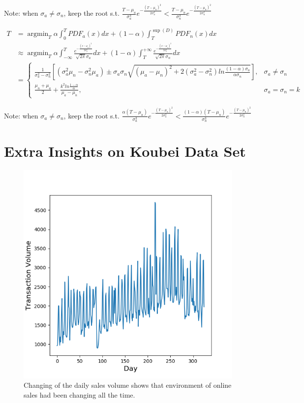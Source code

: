 \documentclass[10pt,conference,letterpaper]{article}
\begin{document}
		Note: when $\sigma_a \ne \sigma_n$, keep the root s.t. $\displaystyle \frac{T - \mu_a}{\sigma_a^3}e^{-\frac{(T - \mu_a)^2}{2\sigma_a^2}} < \frac{T - \mu_n}{\sigma_n^3}e^{-\frac{(T - \mu_n)^2}{2\sigma_n^2}}$
		
		\begin{align}\label{equ:linear-weight}
			T & = \mathop{\arg\min}_{T} \alpha\int_{0}^{T}PDF_{a}(x)dx +
			(1-\alpha)\int_{T}^{\sup(D)}PDF_{n}(x)dx\nonumber\\
			& \approx \mathop{\arg\min}_{T}
			\alpha\int_{-\infty}^{T}
			\frac{e^{-\frac{(x - \mu_a)^2}{2\sigma_a^2}}}{\sqrt{2\pi} \sigma_a}dx
			+ 
			(1-\alpha)\int_{T}^{+\infty}
			\frac{e^{-\frac{(x - \mu_n)^2}{2\sigma_n^2}}}{\sqrt{2\pi} \sigma_n}dx\nonumber\\
			& = \begin{cases}
				\displaystyle
				\frac{1}{\sigma_a^2 - \sigma_n^2}\left[(\sigma_a^2\mu_n - \sigma_n^2\mu_a) \pm \sigma_a\sigma_n\sqrt{(\mu_a - \mu_n)^2 + 2(\sigma_a^2 - \sigma_n^2)ln\frac{(1 - \alpha)\sigma_a}{\alpha\sigma_n}}\right], & \sigma_a \ne \sigma_n\\
				\displaystyle
				\frac{\mu_n + \mu_a}{2} + \frac{k^2ln\frac{1 - \alpha}{\alpha}}{\mu_a - \mu_n}, & \sigma_a = \sigma_n = k
			\end{cases}
		\end{align}
		
		Note: when $\sigma_a \ne \sigma_n$, keep the root s.t. $\displaystyle \frac{\alpha (T - \mu_a)}{\sigma_a^3}e^{-\frac{(T - \mu_a)^2}{2\sigma_a^2}} < \frac{(1 - \alpha) (T - \mu_n)}{\sigma_n^3}e^{-\frac{(T - \mu_n)^2}{2\sigma_n^2}}$
		
	\section{Extra Insights on Koubei Data Set}
		\begin{figure}[!t]
			\centering
			\includegraphics[width=0.5\linewidth]{fig/DailyTransactionVolume.png}
			\caption{Changing of the daily sales volume shows that environment of online sales had been changing all the time.}
			\label{fig:daily-transaction-volume}
		\end{figure}
		
\end{document}
